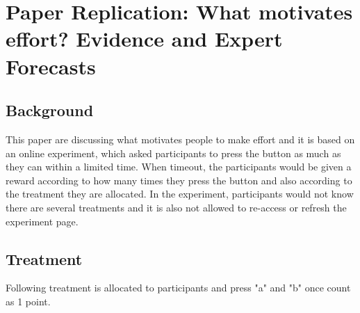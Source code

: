 \documentclass[11pt
]{article}
\author{Yu-Hsin CHEN}
\date{2023/3/25}
\begin{document}
\hypertarget{paper-replication}{%
\section{Paper Replication: What motivates effort? Evidence and Expert Forecasts}\label{paper-replication}}

\hypertarget{background}{%
\subsection{Background}\label{background}}

This paper are discussing what motivates people to make effort and it is
based on an online experiment, which asked participants to press the
button as much as they can within a limited time. When timeout, the
participants would be given a reward according to how many times they press
the button and also according to the treatment they are allocated. In
the experiment, participants would not know there are several treatments
and it is also not allowed to re-access or refresh the experiment page.

\hypertarget{treatment}{%
\subsection{Treatment}\label{treatment}}

Following treatment is allocated to participants and press "a" and "b" once
count as 1 point.
\end{document}
